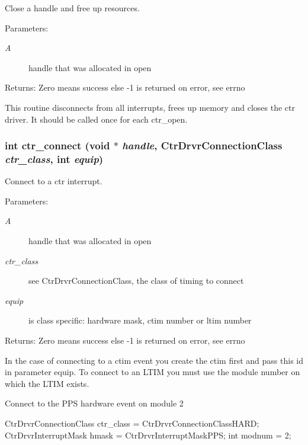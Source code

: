 Close a handle and free up resources. 

\begin{Desc}
\item[Parameters:]
\begin{description}
\item[{\em A}]handle that was allocated in open \end{description}
\end{Desc}
\begin{Desc}
\item[Returns:]Zero means success else -1 is returned on error, see errno\end{Desc}
This routine disconnects from all interrupts, frees up memory and closes the ctr driver. It should be called once for each ctr\_\-open. 
\subsubsection{\setlength{\rightskip}{0pt plus 5cm}int ctr\_\-connect (void $\ast$ {\em handle}, Ctr\-Drvr\-Connection\-Class {\em ctr\_\-class}, int {\em equip})}\label{libctr_8doxygen_621da31345626c2770b80dc981013be7}


Connect to a ctr interrupt. 

\begin{Desc}
\item[Parameters:]
\begin{description}
\item[{\em A}]handle that was allocated in open \item[{\em ctr\_\-class}]see Ctr\-Drvr\-Connection\-Class, the class of timing to connect \item[{\em equip}]is class specific: hardware mask, ctim number or ltim number \end{description}
\end{Desc}
\begin{Desc}
\item[Returns:]Zero means success else -1 is returned on error, see errno\end{Desc}
In the case of connecting to a ctim event you create the ctim first and pass this id in parameter equip. To connect to an LTIM you must use the module number on which the LTIM exists.

Connect to the PPS hardware event on module 2

Ctr\-Drvr\-Connection\-Class ctr\_\-class = Ctr\-Drvr\-Connection\-Class\-HARD; Ctr\-Drvr\-Interrupt\-Mask hmask = Ctr\-Drvr\-Interrupt\-Mask\-PPS; int modnum = 2;

